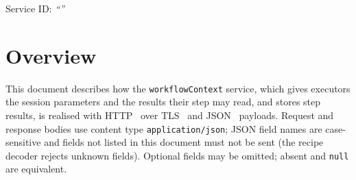\documentclass[a4paper]{arrowhead}
\begin{document}
\ArrowheadSetup

\begin{center}
  \vspace*{1cm}
  \huge{\arrowtitle}

  \vspace*{0.2cm}
  \LARGE{\arrowtype}
  \vspace*{1cm}

  \Large{Service ID: \textit{``\arrowid''}}
  \vspace*{\fill}

  

  \vspace*{1cm}
  \vspace*{\fill}

  \begin{abstract}
    This document describes the HTTP/TLS/JSON interface of the \texttt{workflow\allowbreak{}Context} service of the Eclipse Arrowhead workflow support systems, service version 1.0.0, documentation edition 5.4.0. It realises the abstract operations of the \texttt{workflow\allowbreak{}Context} SD.
  \end{abstract}

  \vspace*{1cm}
\end{center}

\newpage

\tableofcontents
\newpage

\section{Overview}
\label{sec:overview}
This document describes how the \texttt{workflow\allowbreak{}Context} service, which gives executors the session parameters and the results their step may read, and stores step results, is realised with HTTP~\cite{rfc9110}
over TLS~\cite{rfc8446} and JSON~\cite{rfc8259} payloads. Request and response bodies use content type
\texttt{application/\allowbreak{}json}; JSON field names are case-sensitive and fields not listed in this document must not be sent
(the recipe decoder rejects unknown fields). Optional fields may be omitted; absent and \texttt{null} are equivalent.
\end{document}
